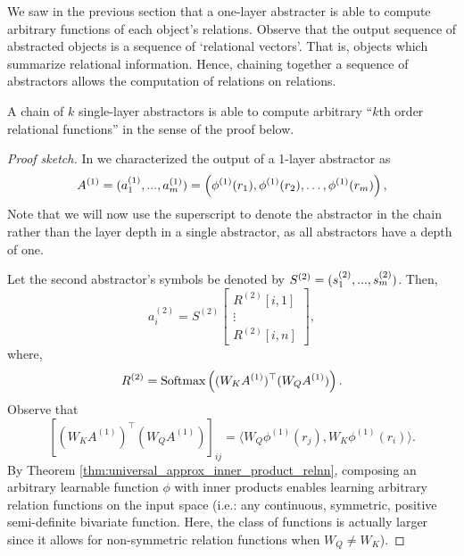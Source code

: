 We saw in the previous section that a one-layer abstracter is able to compute arbitrary functions  of each object's relations. Observe that the output sequence of abstracted objects is a sequence of `relational vectors'. That is, objects which summarize relational information. Hence, chaining together a sequence of  abstractors allows the computation of relations on relations.

\begin{lemma}
	\label{lemma:function_class_composed_abstractors}
	A chain of $k$ single-layer  abstractors is able to compute arbitrary ``$k$th order relational functions'' in the sense of the proof below.
\end{lemma}
\begin{proof}[Proof sketch]
	In  we characterized the output of a 1-layer abstractor as
	\begin{equation*}
		A^{(1)} = (a_1^{(1)}, ..., a_\m^{(1)}) = \left(\phi^{(1)}(r_1), \phi^{(1)}(r_2), \ldots, \phi^{(1)}(r_\m)\right),
	\end{equation*}
	Note that we will now use the superscript to denote the abstractor in the chain rather than the layer depth in a single  abstractor, as all  abstractors have a depth of one.

	Let the second abstractor's symbols be denoted by $S^{(2)} = (s_1^{(2)}, ..., s_m^{(2)})$. Then,
	\begin{equation*}
		a_i^{(2)} = S^{(2)} \begin{bmatrix}R^{(2)}[i,1] \\ \vdots \\ R^{(2)}[i,n]\end{bmatrix},
	\end{equation*}
	where,
	\begin{equation*}
		R^{(2)} = \Softmax\left((W_K A^{(1)})^\top (W_Q A^{(1)})\right).
	\end{equation*}
	Observe that
	\begin{equation*}
		\left[(W_K A^{(1)})^\top (W_Q A^{(1)})\right]_{ij} = \langle W_Q \phi^{(1)}(r_j), W_K \phi^{(1)}(r_i) \rangle.
	\end{equation*}
	By Theorem \ref{thm:universal_approx_inner_product_relnn}, composing an arbitrary learnable function $\phi$ with inner products enables learning arbitrary relation functions on the input space (i.e.: any continuous, symmetric, positive semi-definite bivariate function. Here, the class of functions is actually larger since it allows for non-symmetric relation functions when $W_Q \neq W_K$).


\end{proof}
